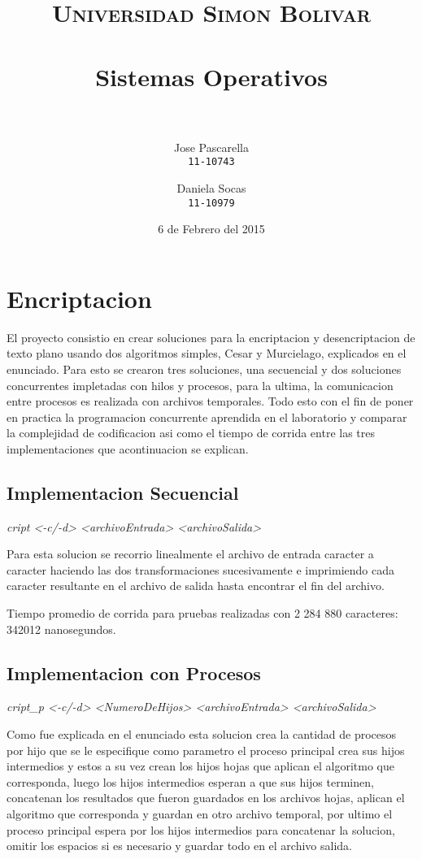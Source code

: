 \documentclass[paper=a4, fontsize=11pt]{scrartcl} %
\title{	
\normalfont \normalsize 
\textsc{Universidad Simon Bolivar} \\ [25pt] %
\horrule{0.5pt} \\[0.4cm] %
\huge Sistemas Operativos \\ %
\horrule{2pt} \\[0.5cm] %
}
\author{
  Jose Pascarella\\
  \texttt{11-10743}
  \and
  Daniela Socas\\
  \texttt{11-10979}
}
\date{6 de Febrero del 2015} %
\begin{document}
\maketitle %


\section{Encriptacion}

El proyecto consistio en crear soluciones para la encriptacion y desencriptacion de texto plano usando dos algoritmos simples, Cesar y Murcielago, explicados en el enunciado. Para esto se crearon tres soluciones, una secuencial y dos soluciones concurrentes impletadas con hilos y procesos, para la ultima, la comunicacion entre procesos es realizada con archivos temporales. Todo esto con el fin de poner en practica la programacion concurrente aprendida en el laboratorio y comparar la complejidad de codificacion asi como el tiempo de corrida entre las tres implementaciones que acontinuacion se explican.


\subsection{Implementacion Secuencial}\newline


\emph{cript <-c/-d> <archivoEntrada> <archivoSalida>}\newline

Para esta solucion se recorrio linealmente el archivo de entrada caracter a caracter haciendo las dos transformaciones sucesivamente e imprimiendo cada caracter resultante en el archivo de salida hasta encontrar el fin del archivo.

Tiempo promedio de corrida para pruebas realizadas con 2 284 880 caracteres: 342012 nanosegundos.

\newpage


\subsection{Implementacion con Procesos}\newline

\emph{cript\_p <-c/-d> <NumeroDeHijos> <archivoEntrada> <archivoSalida>}\newline

Como fue explicada en el enunciado esta solucion crea la cantidad de procesos por hijo que se le especifique como parametro el proceso principal crea sus hijos intermedios y estos a su vez crean los hijos hojas que aplican el algoritmo que corresponda, luego los hijos intermedios esperan a que sus hijos terminen, concatenan los resultados que fueron guardados en los archivos hojas, aplican el algoritmo que corresponda y guardan en otro archivo temporal, por ultimo el proceso principal espera por los hijos intermedios para concatenar la solucion, omitir los espacios si es necesario y guardar todo en el archivo salida.
\end{document}
